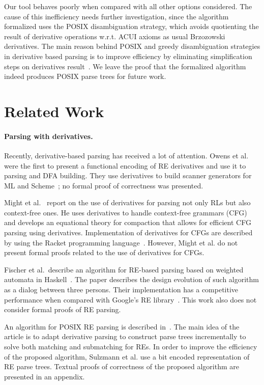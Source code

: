 \documentclass[sigconf]{acmart}
\theoremstyle{definition}
\begin{document}
Our tool behaves poorly when compared with all other options
considered. The cause of this inefficiency needs further
investigation, since the algorithm formalized uses the POSIX 
disambiguation strategy, which avoids quotienting the result of derivative
operations w.r.t. ACUI axioms as usual Brzozowski derivatives. 
The main reason behind POSIX and greedy disambiguation strategies in 
derivative based parsing is to improve efficiency by eliminating 
simplification steps on derivatives result~\cite{SulzmannL14}. We leave 
the proof that the formalized algorithm indeed produces POSIX parse trees 
for future work.

\section{Related Work}\label{sec:related}

\paragraph{Parsing with derivatives.} Recently, derivative-based
parsing has received a lot of attention. Owens et al. were the first
to present a functional encoding of RE derivatives and use it to
parsing and DFA building. They use derivatives to build scanner
generators for ML and Scheme~\cite{Owens2009}; no formal proof of
correctness was presented.

Might et al.~\cite{Might2011} report on
the use of derivatives for parsing not only RLs but also context-free
ones. He uses derivatives to handle context-free grammars (CFG) and
develops an equational theory for compaction that allows for efficient
CFG parsing using derivatives. Implementation of derivatives for CFGs
are described by using the Racket programming
language~\cite{Felleisen2013}. However, Might et al. do not present
formal proofs related to the use of derivatives for CFGs.

Fischer et al.~describe an algorithm for RE-based parsing based on
weighted automata in Haskell~\cite{Fischer2010}.  The paper describes
the design evolution of such algorithm as a dialog between three
persons. Their implementation has a competitive performance when
compared with Google's RE library~\cite{re2}. This work also does not
consider formal proofs of RE parsing.

An algorithm for POSIX RE parsing is described
in~\cite{SulzmannL14}. The main idea of the article is to adapt
derivative parsing to construct parse trees incrementally to solve
both matching and submatching for REs. In order to improve the
efficiency of the proposed algorithm, Sulzmann et al. use a bit
encoded representation of RE parse trees. Textual proofs of
correctness of the proposed algorithm are presented in an appendix.
\end{document}
